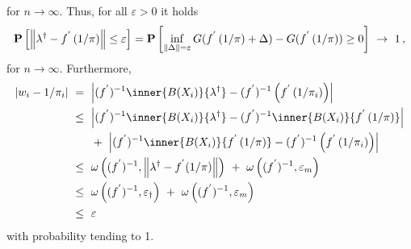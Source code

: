  for $ n \to \infty $.
 Thus, for all $ \varepsilon > 0 $
 it holds
 \begin{gather*}
   \P
   \left[ 
     \norm
     {
      \lambda ^ \dagger
      -
      f ^ { ' }
      \left( 
        1 / \pi 
      \right)
     }
     \le
     \varepsilon
   \right]
   =
   \P
   \left[ 
     \inf _ { \norm{\Delta} = \varepsilon }
     G
     (
      f ^ { ' }
      \left( 
        1 / \pi 
      \right)
      +
      \Delta
     )
     -
     G
     (
      f ^ { ' }
      \left( 
        1 / \pi 
      \right)
     )
     \ge 
     0
   \right]
   \ 
   \to 
   \ 
   1
   \,,
 \end{gather*}
 for $ n \to \infty $.
 Furthermore,
 \begin{align*}
   \left| 
   w_i
   -
   1 / \pi_i
   \right|
   & 
   \ 
   =
   \ 
   \left| 
   (
      f ^ { ' }
   )
   ^ {-1}
   \inner
   {B(X_i)}
   { \lambda ^ \dagger }
   -
     (f ^ { ' }) ^ { -1 }
     \left( 
      f ^ { ' }
      \left( 
        1 / \pi _ i
      \right)
     \right)
   \right|
   \\
   & 
   \ 
   \le
   \ 
   \left| 
   (
      f ^ { ' }
   )
   ^ {-1}
   \inner
   {B(X_i)}
   { \lambda ^ \dagger }
   -
   (
      f ^ { ' }
   )
   ^ {-1}
          \inner
          {B(X_i)}
          {
      f ^ { ' }
      \left( 
        1 / \pi 
      \right)
          }
   \right|
   \\
   &
   \qquad
   +
   \ 
   \left| 
   (
      f ^ { ' }
   )
   ^ {-1}
          \inner
          {B(X_i)}
          {
      f ^ { ' }
      \left( 
        1 / \pi 
      \right)
          }
   -
     (f ^ { ' }) ^ { -1 }
     \left( 
      f ^ { ' }
      \left( 
        1 / \pi _ i
      \right)
     \right)
   \right|
   \\
   &
   \ 
   \le
   \ 
   \omega
   \left( 
     (f ^ { ' }) ^ { -1 }
     ,
     \norm{ \lambda ^ \dagger - f ^ {'} (1/\pi) }
   \right)
   \ 
   +
   \ 
   \omega
   \left( 
     (f ^ { ' }) ^ { -1 }
     ,
     \varepsilon _ m
   \right)
   \\
   &
   \ 
   \le
   \ 
   \omega
   \left( 
     (f ^ { ' }) ^ { -1 }
     ,
     \varepsilon _ \dagger
   \right)
   \ 
   +
   \ 
   \omega
   \left( 
     (f ^ { ' }) ^ { -1 }
     ,
     \varepsilon _ m
   \right)
   \\
   &
   \ 
   \le
   \ 
   \varepsilon
 \end{align*}
 with probability tending to 1.

